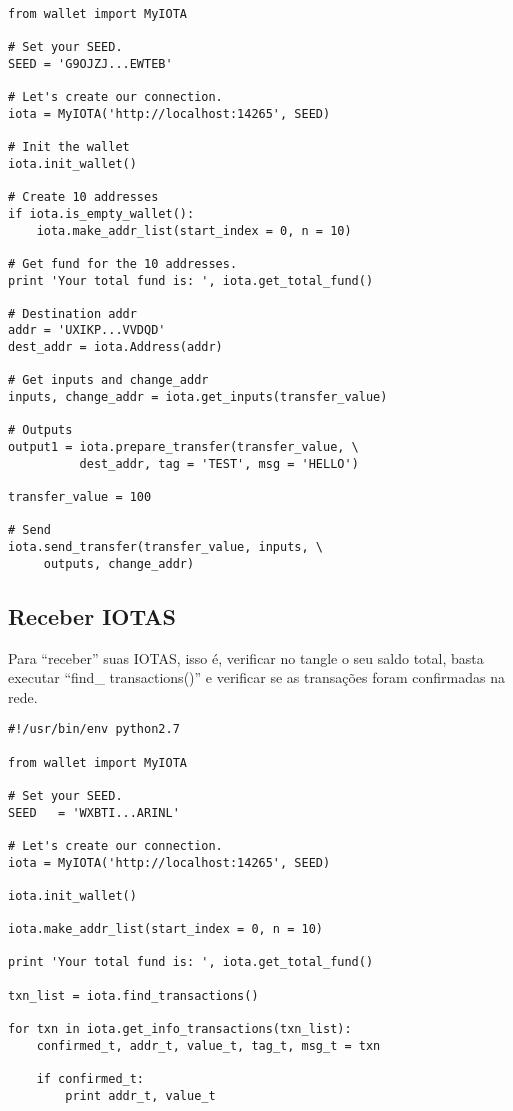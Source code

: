 \documentclass[a4paper]{article}
\begin{document}
\begin{lstlisting}
from wallet import MyIOTA

# Set your SEED.
SEED = 'G9OJZJ...EWTEB'

# Let's create our connection.
iota = MyIOTA('http://localhost:14265', SEED)

# Init the wallet
iota.init_wallet()

# Create 10 addresses
if iota.is_empty_wallet():
    iota.make_addr_list(start_index = 0, n = 10)

# Get fund for the 10 addresses.
print 'Your total fund is: ', iota.get_total_fund()

# Destination addr
addr = 'UXIKP...VVDQD'
dest_addr = iota.Address(addr)

# Get inputs and change_addr
inputs, change_addr = iota.get_inputs(transfer_value)

# Outputs
output1 = iota.prepare_transfer(transfer_value, \
          dest_addr, tag = 'TEST', msg = 'HELLO')

transfer_value = 100

# Send
iota.send_transfer(transfer_value, inputs, \
     outputs, change_addr)
\end{lstlisting}

\subsection{Receber IOTAS}

Para ``receber'' suas IOTAS, isso é, verificar no tangle o seu saldo total, basta executar ``find\_ transactions()'' e
verificar se as transações foram confirmadas na rede.

\begin{lstlisting}
#!/usr/bin/env python2.7

from wallet import MyIOTA

# Set your SEED.
SEED   = 'WXBTI...ARINL'

# Let's create our connection.
iota = MyIOTA('http://localhost:14265', SEED)

iota.init_wallet()

iota.make_addr_list(start_index = 0, n = 10)

print 'Your total fund is: ', iota.get_total_fund()

txn_list = iota.find_transactions()

for txn in iota.get_info_transactions(txn_list):
    confirmed_t, addr_t, value_t, tag_t, msg_t = txn

    if confirmed_t:
        print addr_t, value_t
\end{lstlisting}
\end{document}
